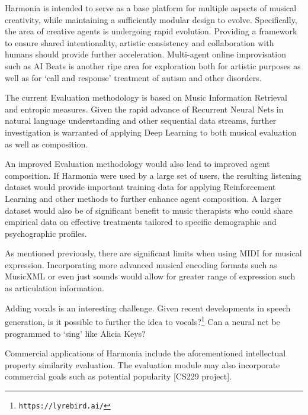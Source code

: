 \documentclass[final,authoryear,5p,times,twocolumn]{elsarticle}
\begin{document}
Harmonia is intended to serve as a base platform for multiple aspects of musical creativity, while maintaining a sufficiently modular design to evolve. Specifically, the area of creative agents is undergoing rapid evolution. Providing a framework to ensure shared intentionality, artistic consistency and collaboration with humans should provide further acceleration. Multi-agent online improvisation such as AI Beats is another ripe area for exploration both for artistic purposes as well as for `call and response' treatment of autism and other disorders. 

The current Evaluation methodology is based on Music Information Retrieval and entropic measures. Given the rapid advance of Recurrent Neural Nets in natural language understanding and other sequential data streams, further investigation is warranted of applying Deep Learning to both musical evaluation as well as composition.

An improved Evaluation methodology would also lead to improved agent composition. If Harmonia were used by a large set of users, the resulting listening dataset would provide important training data for applying Reinforcement Learning and other methods to further enhance agent composition. A larger dataset would also be of significant benefit to music therapists who could share empirical data on effective treatments tailored to specific demographic and psychographic profiles.

As mentioned previously, there are significant limits when using MIDI for musical expression. Incorporating more advanced musical encoding formats such as MusicXML or even just sounds would allow for greater range of expression such as articulation information.

Adding vocals is an interesting challenge. Given recent developments in speech generation, is it possible to further the idea to vocals?\footnote{\texttt{https://lyrebird.ai/}} Can a neural net be programmed to `sing' like Alicia Keys? 

Commercial applications of Harmonia include the aforementioned intellectual property similarity evaluation. The evaluation module may also incorporate commercial goals such as potential popularity [CS229 project].



\end{document}
